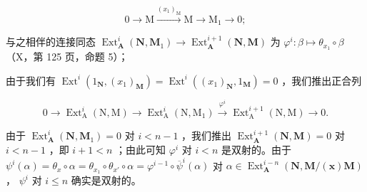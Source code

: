 \[
0 \longrightarrow \mathrm{M} \xrightarrow {(x _ {1}) _ {\mathrm{M}}} \mathrm{M} \longrightarrow \mathrm{M} _ {1} \longrightarrow 0;
\]

与之相伴的连接同态 \(\operatorname{Ext}_{\mathbf{A}}^{i}(\mathbf{N}, \mathbf{M}_{1}) \to \operatorname{Ext}_{\mathbf{A}}^{i+1}(\mathbf{N}, \mathbf{M})\) 为 \(\varphi^{i}: \beta \mapsto \theta_{x_{1}} \circ \beta\) （X，第 125 页，命题 5）；

由于我们有 \(\operatorname{Ext}^i(1_{\mathbf{N}}, (x_1)_{\mathbf{M}}) = \operatorname{Ext}^i((x_1)_{\mathbf{N}}, 1_{\mathbf{M}}) = 0\) ，我们推出正合列

\[
0 \longrightarrow \operatorname{Ext} _ {\mathrm{A}} ^ {i} (\mathrm{N}, \mathrm{M}) \longrightarrow \operatorname{Ext} _ {\mathrm{A}} ^ {i} (\mathrm{N}, \mathrm{M} _ {1}) \xrightarrow {\varphi^ {i}} \operatorname{Ext} _ {\mathrm{A}} ^ {i + 1} (\mathrm{N}, \mathrm{M}) \longrightarrow 0.
\]

由于 \(\operatorname{Ext}_{\mathbf{A}}^{i}(\mathbf{N}, \mathbf{M}_{1}) = 0\) 对 \(i < n - 1\) ，我们推出 \(\operatorname{Ext}_{\mathbf{A}}^{i + 1}(\mathbf{N}, \mathbf{M}) = 0\) 对 \(i < n - 1\) ，即 \(i + 1 < n\) ；由此可知 \(\varphi^{i}\) 对 \(i < n\) 是双射的。由于 \(\psi^{i}(\alpha) = \theta_{x} \circ \alpha = \theta_{x_{1}} \circ \theta_{x'} \circ \alpha = \varphi^{i - 1} \circ \overline{\psi}^{i}(\alpha)\) 对 \(\alpha \in \operatorname{Ext}_{\mathbf{A}}^{i - n}(\mathbf{N}, \mathbf{M}/(\mathbf{x})\mathbf{M})\) ， \(\psi^{i}\) 对 \(i \leqslant n\) 确实是双射的。

\backmatter
